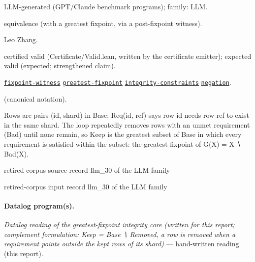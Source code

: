\documentclass[10pt]{article}
\begin{document}
\begin{description}[leftmargin=2.6cm,style=nextline,itemsep=1pt]

\item[Category] LLM-generated (GPT/Claude benchmark programs); family: LLM.

\item[Kind] equivalence (with a greatest fixpoint, via a post-fixpoint witness).

\item[Contributors] Leo Zhang.

\item[Status] certified valid (Certificate/Valid.lean, written by the certificate emitter); expected valid (expected; strengthened claim).

\item[Tags] \hyperref[tag:fixpoint-witness]{\texttt{fixpoint-witness}} \hyperref[tag:greatest-fixpoint]{\texttt{greatest-fixpoint}} \hyperref[tag:integrity-constraints]{\texttt{integrity-constraints}} \hyperref[tag:negation]{\texttt{negation}}.

\item[Input]  (canonical notation).

\item[Summary] Rows are pairs (id, shard) in Base; Req(id, ref) says row id needs row ref to exist in the same shard. The loop repeatedly removes rows with an unmet requirement (Bad) until none remain, so Keep is the greatest subset of Base in which every requirement is satisfied within the subset: the greatest fixpoint of G(X) = X ∖ Bad(X).

\item[Sources] {\raggedright retired-corpus source record llm\_30 of the LLM family \par retired-corpus input record llm\_30 of the LLM family\par}

\end{description}

\paragraph{Datalog program(s).}

{\raggedright\textit{Datalog reading of the greatest-fixpoint integrity core (written for this report; complement formulation: Keep = Base ∖ Removed, a row is removed when a requirement points outside the kept rows of its shard)} --- hand-written reading (this report).\par}
\end{document}
